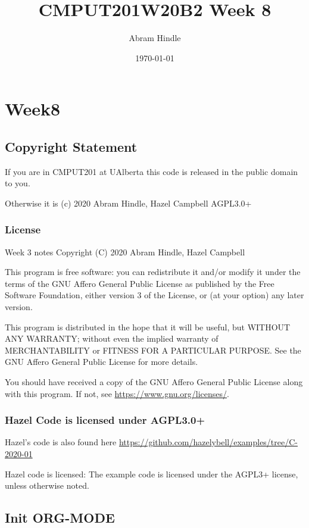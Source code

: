 \documentclass[11pt]{article}
\author{Abram Hindle}
\date{\today}
\title{CMPUT201W20B2 Week 8}
\begin{document}
\maketitle
\tableofcontents


\section{Week8}
\label{sec:org9991568}
\subsection{Copyright Statement}
\label{sec:orgc30d214}

If you are in CMPUT201 at UAlberta this code is released in the public
domain to you.

Otherwise it is (c) 2020 Abram Hindle, Hazel Campbell AGPL3.0+

\subsubsection{License}
\label{sec:orgca8d0fd}

Week 3 notes
Copyright (C) 2020 Abram Hindle, Hazel Campbell

This program is free software: you can redistribute it and/or modify
it under the terms of the GNU Affero General Public License as
published by the Free Software Foundation, either version 3 of the
License, or (at your option) any later version.

This program is distributed in the hope that it will be useful,
but WITHOUT ANY WARRANTY; without even the implied warranty of
MERCHANTABILITY or FITNESS FOR A PARTICULAR PURPOSE.  See the
GNU Affero General Public License for more details.

You should have received a copy of the GNU Affero General Public License
along with this program.  If not, see \url{https://www.gnu.org/licenses/}.


\subsubsection{Hazel Code is licensed under AGPL3.0+}
\label{sec:org628a89a}

Hazel's code is also found here
\url{https://github.com/hazelybell/examples/tree/C-2020-01}

Hazel code is licensed: The example code is licensed under the AGPL3+
license, unless otherwise noted.

\subsection{Init ORG-MODE}
\label{sec:org57a8739}
\end{document}
